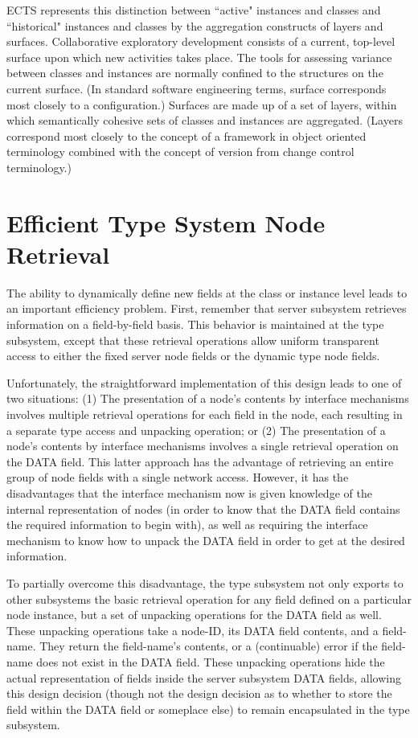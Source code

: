 ECTS represents this distinction between ``active" instances and
classes and ``historical" instances and classes by the aggregation
constructs of layers and surfaces.  Collaborative exploratory
development consists of a current, top-level surface upon which new
activities takes place.  The tools for assessing variance between
classes and instances are normally confined to the structures on the
current surface.  (In standard software engineering terms, surface
corresponds most closely to a configuration.)  Surfaces are made up of
a set of layers, within which semantically cohesive sets of classes
and instances are aggregated.  (Layers correspond most closely to the
concept of a framework in object oriented terminology combined with
the concept of version from change control terminology.)


\section{Efficient Type System Node Retrieval}
\label{type-dr}


The ability to dynamically define new fields at the class or instance
level leads to an important efficiency problem.  First, remember that
server subsystem retrieves information on a field-by-field basis.
This behavior is maintained at the type subsystem, except that these
retrieval operations allow uniform transparent access to either the
fixed server node fields or the dynamic type node fields.

Unfortunately, the straightforward implementation of this design leads
to one of two situations: (1) The presentation of a node's contents by
interface mechanisms involves multiple retrieval operations for each
field in the node, each resulting in a separate type access and
unpacking operation; or (2) The presentation of a node's contents by
interface mechanisms involves a single retrieval operation on the DATA
field.  This latter approach has the advantage of retrieving an entire
group of node fields with a single network access.  However, it has
the disadvantages that the interface mechanism now is given knowledge
of the internal representation of nodes (in order to know that the
DATA field contains the required information to begin with), as well
as requiring the interface mechanism to know how to unpack the DATA
field in order to get at the desired information.

To partially overcome this disadvantage, the type subsystem not only
exports to other subsystems the basic retrieval operation for any
field defined on a particular node instance, but a set of unpacking
operations for the DATA field as well.  These unpacking operations
take a node-ID, its DATA field contents, and a field-name. They return
the field-name's contents, or a (continuable) error if the field-name
does not exist in the DATA field.    These
unpacking operations hide the actual representation of fields inside
the server subsystem DATA fields, allowing this design decision
(though not the design decision as to whether to store the field
within the DATA field or someplace else) to remain encapsulated in the
type subsystem.

